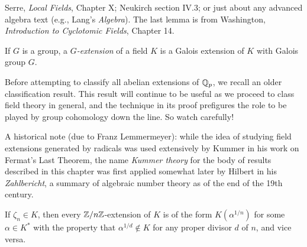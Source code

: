 %
%
%
%
%
%
%

 Serre, \emph{Local Fields}, Chapter X;
Neukirch section IV.3; or just about
any advanced algebra text (e.g., Lang's \emph{Algebra}). The last lemma is 
from Washington, \emph{Introduction to Cyclotomic Fields}, Chapter 14.

 If $G$ is a group, a \emph{$G$-extension} of a field
$K$ is a Galois extension of $K$ with Galois group $G$.

\medskip
Before attempting to classify all abelian extensions of $\mathbb{Q}_p$,
we recall an older classification result. This result will
continue to be useful as we proceed to class field theory in general, and 
the technique in its proof prefigures the role to be played
by group cohomology down the line. So watch carefully!

A historical note (due to Franz Lemmermeyer): while the idea of studying field extensions generated by radicals was used extensively by Kummer in his work on Fermat's Last Theorem,
the name \emph{Kummer theory} for the body of results described in this chapter was first applied somewhat later by Hilbert in his \textit{Zahlbericht}, a summary of algebraic number theory as of the end of the 19th century.

\label{T:local Kronecker-Weber}

\begin{theorem} \label{T:Kummer}
If $\zeta_n \in K$, then every $\mathbb{Z}/n\mathbb{Z}$-extension of $K$ is of the form
$K(\alpha^{1/n})$ for some $\alpha \in K^*$ with the property that
$\alpha^{1/d} \notin K$ for any proper divisor $d$ of $n$, and vice versa.
\end{theorem}

